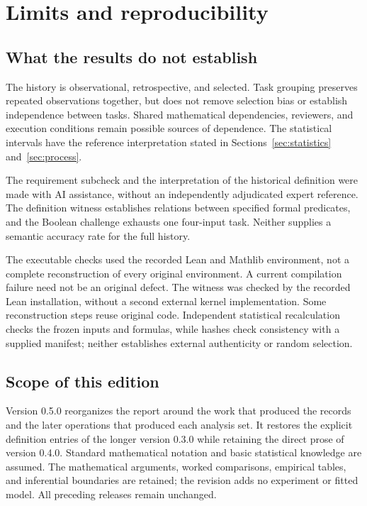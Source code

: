 \section{Limits and reproducibility}
\label{sec:limitations}
\subsection{What the results do not establish}
The history is observational, retrospective, and selected. Task grouping preserves repeated observations together, but does not remove selection bias or establish independence between tasks. Shared mathematical dependencies, reviewers, and execution conditions remain possible sources of dependence. The statistical intervals have the reference interpretation stated in Sections~\ref{sec:statistics} and~\ref{sec:process}.

The requirement subcheck and the interpretation of the historical definition were made with AI assistance, without an independently adjudicated expert reference. The definition witness establishes relations between specified formal predicates, and the Boolean challenge exhausts one four-input task. Neither supplies a semantic accuracy rate for the full history.

The executable checks used the recorded Lean and Mathlib environment, not a complete reconstruction of every original environment. A current compilation failure need not be an original defect. The witness was checked by the recorded Lean installation, without a second external kernel implementation. Some reconstruction steps reuse original code. Independent statistical recalculation checks the frozen inputs and formulas, while hashes check consistency with a supplied manifest; neither establishes external authenticity or random selection.

\subsection{Scope of this edition}
Version 0.5.0 reorganizes the report around the work that produced the records and the later operations that produced each analysis set. It restores the explicit definition entries of the longer version 0.3.0 while retaining the direct prose of version 0.4.0. Standard mathematical notation and basic statistical knowledge are assumed. The mathematical arguments, worked comparisons, empirical tables, and inferential boundaries are retained; the revision adds no experiment or fitted model. All preceding releases remain unchanged.


